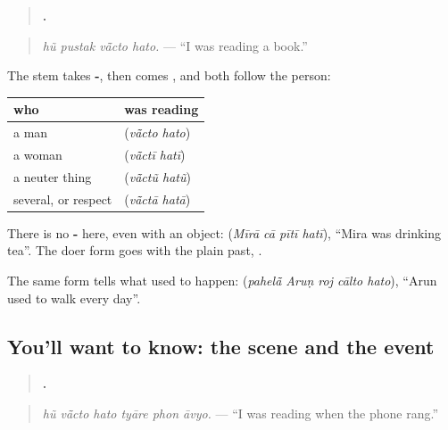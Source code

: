 \begin{grammarlens}[title={Grammar Lens: -\gu{તો} with \gu{હતો}}]
\begin{quote}
\textbf{   .}
\end{quote}

\begin{quote}
\emph{hũ pustak vā̃cto hato.} — \textquotedblleft{}I was reading a book.\textquotedblright{}
\end{quote}

The stem takes \textbf{-}, then comes \textbf{}, and both follow the person:

\noindent
\begin{tabularx}{\linewidth}{@{}>{\raggedright\arraybackslash}X>{\raggedright\arraybackslash}X@{}}
\toprule
\textbf{who} & \textbf{was reading} \\
\midrule
a man & \textbf{\gu{વાંચતો} \gu{હતો}} (\emph{vā̃cto hato}) \\
a woman & \textbf{\gu{વાંચતી} \gu{હતી}} (\emph{vā̃ctī hatī}) \\
a neuter thing & \textbf{\gu{વાંચતું} \gu{હતું}} (\emph{vā̃ctũ hatũ}) \\
several, or respect & \textbf{\gu{વાંચતા} \gu{હતા}} (\emph{vā̃ctā hatā}) \\
\bottomrule
\end{tabularx}

There is no \textbf{-} here, even with an object: \textbf{   } (\emph{Mīrā cā pītī hatī}), \textquotedblleft{}Mira was drinking tea\textquotedblright{}. The doer form goes with the plain past, \textbf{}.

The same form tells what used to happen: \textbf{    } (\emph{pahelā̃ Aruṇ roj cālto hato}), \textquotedblleft{}Arun used to walk every day\textquotedblright{}.
\end{grammarlens}

\subsection*{You'll want to know: the scene and the event}
\begin{quote}
\textbf{     .}
\end{quote}

\begin{quote}
\emph{hũ vā̃cto hato tyāre phon āvyo.} — \textquotedblleft{}I was reading when the phone rang.\textquotedblright{}
\end{quote}

